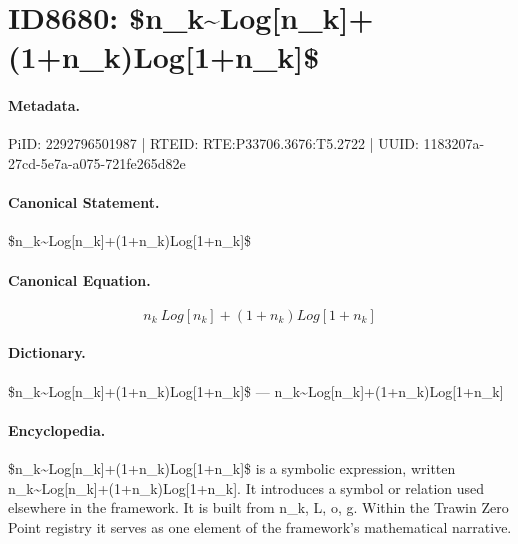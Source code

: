 \section*{ID8680: \$n\_k\textasciitilde{}Log[n\_k]+(1+n\_k)Log[1+n\_k]\$}
\paragraph{Metadata.}
PiID: 2292796501987 | RTEID: RTE:P33706.3676:T5.2722 | UUID: 1183207a-27cd-5e7a-a075-721fe265d82e

\paragraph{Canonical Statement.}
\$n\_k\textasciitilde{}Log[n\_k]+(1+n\_k)Log[1+n\_k]\$

\paragraph{Canonical Equation.}
\[
n_k~Log[n_k]+(1+n_k)Log[1+n_k]
\]

\paragraph{Dictionary.}
\$n\_k\textasciitilde{}Log[n\_k]+(1+n\_k)Log[1+n\_k]\$ — n\_k\textasciitilde{}Log[n\_k]+(1+n\_k)Log[1+n\_k]

\paragraph{Encyclopedia.}
\$n\_k\textasciitilde{}Log[n\_k]+(1+n\_k)Log[1+n\_k]\$ is a symbolic expression, written n\_k\textasciitilde{}Log[n\_k]+(1+n\_k)Log[1+n\_k]. It introduces a symbol or relation used elsewhere in the framework. It is built from n\_k, L, o, g. Within the Trawin Zero Point registry it serves as one element of the framework's mathematical narrative.
